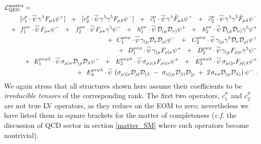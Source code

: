 \documentclass[12pt]{revtex4}
\newcommand{\wt}{\widetilde}
\newcommand{\ov}{\overline}
\newcommand{\md}{\mathcal{D}}
\begin{document}
\begin{eqnarray}
\nonumber
\lefteqn{
	\mathcal{L}_{\rm QED}^{\rm matter} = 
	}
	\\
\nonumber
	&&
	\phantom{+~~}
	[c_1^{\mu}\cdot
	\ov{\psi}\, \gamma^\lambda F_{\mu\lambda} \psi {}^{+}] ~~+~~
	[c_2^{\mu}\cdot
	\ov{\psi}\, \gamma^\lambda \gamma^5 F_{\mu\lambda} \psi {}^{-}] ~~+~~
	\wt{c}_1^{\mu}\cdot
	\ov{\psi}\, \gamma^\lambda \wt{F}_{\mu\lambda} \psi {}^{+} ~~+~~
	\wt{c}_2^{\mu}\cdot
	\ov{\psi}\, \gamma^\lambda \gamma^5 \wt{F}_{\mu\lambda} \psi {}^{-}
	\\
\nonumber
	&&
	+~~
	f_1^{\mu\nu}\cdot
	\ov{\psi}\, F_{\mu\nu} \psi {}^{-} ~~+~~
	f_2^{\mu\nu}\cdot
	\ov{\psi}\, F_{\mu\nu} \gamma^5 \psi {}^{-} ~~+~~
	h_1^{\mu\nu}\cdot
	\ov{\psi}\, \mathcal{D}_{(\mu} \mathcal{D}_{\nu)} \psi {}^{+} ~~+~~
	h_2^{\mu\nu}\cdot
	\ov{\psi}\, \mathcal{D}_{(\mu} \mathcal{D}_{\nu)} \gamma^5 \psi {}^{+} 
	\\
\label{QED_matter}
	&&
	+~~
	C_1^{\mu\nu\rho}\cdot
	\ov{\psi}\, \gamma_{(\mu} 
		\mathcal{D}_\nu \mathcal{D}_{\rho)} \psi {}^{-} ~~+~~
	C_2^{\mu\nu\rho}\cdot
	\ov{\psi}\, \gamma_{(\mu} \gamma^5
	\mathcal{D}_\nu \mathcal{D}_{\rho)} \psi {}^{+} 
	\\
\nonumber
	&&
	+~~
	D_1^{\mu\nu\rho}\cdot
	\ov{\psi}\, \gamma_{(\mu} F_{\rho)\nu} \psi {}^{+} ~~+~~
	D_2^{\mu\nu\rho}\cdot
	\ov{\psi}\, \gamma_{(\mu} F_{\rho)\nu} \gamma^5 \psi {}^{-} 
	\\
\nonumber
	&&
	+~~
	E_1^{\mu\nu\rho\lambda}\cdot
	\ov{\psi}\, \sigma_{\mu)\nu} \mathcal{D}_{(\rho}\mathcal{D}_\lambda 
			\psi {}^{-} ~~+~~
	E_2^{\mu\nu\rho\lambda}\cdot
	\ov{\psi}\, \sigma_{\mu)(\lambda} F_{\rho)(\nu} \psi {}^{+} ~~+~~
	E_3^{\mu\nu\rho\lambda}\cdot
	\ov{\psi}\, \sigma_{\mu)[\nu} F_{\rho](\lambda} \psi {}^{+} 
	\\
\nonumber
	&&
	+~~
	E_4^{\mu\nu\rho\lambda}\cdot
	\ov{\psi}\, \left ( 
		\sigma_{\mu)[\nu} \mathcal{D}_{\rho]}\mathcal{D}_{(\lambda}
		~-~
		\sigma_{\nu](\mu} \mathcal{D}_{\lambda)}\mathcal{D}_{[\rho}
		~+~
		2\, \sigma_{\nu\rho} \md_{(\mu} \md_{\lambda)}
		\right ) \psi {}^{-} 
	~.
\end{eqnarray}
	We again stress that all structures shown here assume
	their coefficients to be {\it irreducible tensors} of the 
	corresponding rank. 
	The first two operators, $ c_1^\mu $ and $ c_2^\mu $ are not true
	LV operators, as they reduce on the EOM to zero; 
	nevertheless we have listed them in square brackets 
	for the matter of completeness
	({\it c.f.} the discussion of QCD sector in section \ref{matter_SM}
	where such operators become nontrivial).
\end{document}
